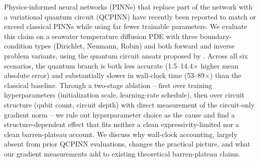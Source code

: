 Physics-informed neural networks (PINNs) that replace part of the network
with a variational quantum circuit (QCPINN) have recently been reported to
match or exceed classical PINNs while using far fewer trainable parameters.
We evaluate this claim on a seawater temperature diffusion PDE with three
boundary-condition types (Dirichlet, Neumann, Robin) and both forward and
inverse problem variants, using the quantum circuit ansatz proposed by
\citet{farea2025qcpinn}. Across all six scenarios, the quantum branch is
both less accurate (1.5--14.4$\times$ higher mean absolute error) and
substantially slower in wall-clock time (53--89$\times$) than the
classical baseline. Through a two-stage ablation -- first over training
hyperparameters (initialization scale, learning-rate schedule), then over
circuit structure (qubit count, circuit depth) with direct measurement of
the circuit-only gradient norm -- we rule out hyperparameter choice as the
cause and find a structure-dependent effect that fits neither a clean
expressivity-limited nor a clean barren-plateau account. We discuss why
wall-clock accounting, largely absent from prior QCPINN evaluations, changes
the practical picture, and what our gradient measurements add to existing
theoretical barren-plateau claims.
